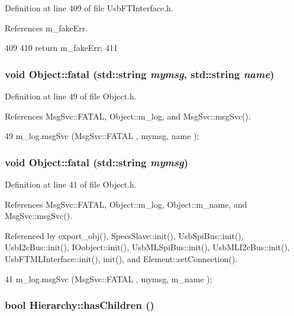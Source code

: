 Definition at line 409 of file UsbFTInterface.h.

References m\_\-fakeErr.


\begin{DoxyCode}
409                           {
410     return m_fakeErr;
411   }
\end{DoxyCode}
\hypertarget{classObject_ae62acd3d09f716220f75f252dc38bc9a}{
\subsubsection[{fatal}]{\setlength{\rightskip}{0pt plus 5cm}void Object::fatal (std::string {\em mymsg}, \/  std::string {\em name})}}
\label{classObject_ae62acd3d09f716220f75f252dc38bc9a}


Definition at line 49 of file Object.h.

References MsgSvc::FATAL, Object::m\_\-log, and MsgSvc::msgSvc().


\begin{DoxyCode}
49 { m_log.msgSvc (MsgSvc::FATAL   , mymsg, name ); }
\end{DoxyCode}
\hypertarget{classObject_aad5a16aac7516ce65bd5ec02ab07fc80}{
\subsubsection[{fatal}]{\setlength{\rightskip}{0pt plus 5cm}void Object::fatal (std::string {\em mymsg})}}
\label{classObject_aad5a16aac7516ce65bd5ec02ab07fc80}


Definition at line 41 of file Object.h.

References MsgSvc::FATAL, Object::m\_\-log, Object::m\_\-name, and MsgSvc::msgSvc().

Referenced by export\_\-obj(), SpecsSlave::init(), UsbSpiBus::init(), UsbI2cBus::init(), IOobject::init(), UsbMLSpiBus::init(), UsbMLI2cBus::init(), UsbFTMLInterface::init(), init(), and Element::setConnection().


\begin{DoxyCode}
41 { m_log.msgSvc (MsgSvc::FATAL   , mymsg, m_name ); }
\end{DoxyCode}
\hypertarget{classHierarchy_a255174fe4d316d2a3f430dcb9dab29f1}{
\subsubsection[{hasChildren}]{\setlength{\rightskip}{0pt plus 5cm}bool Hierarchy::hasChildren ()}}
\label{classHierarchy_a255174fe4d316d2a3f430dcb9dab29f1}


